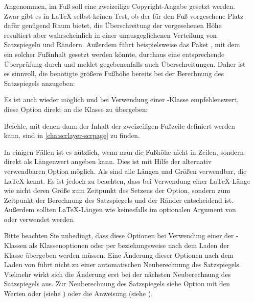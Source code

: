 \begin{Example}
  Angenommen, im Fuß soll eine zweizeilige Copyright-Angabe gesetzt
  werden. Zwar gibt es in \LaTeX{} selbst keinen Test, ob der für den Fuß
  vorgesehene Platz dafür genügend Raum bietet, die Überschreitung der
  vorgesehenen Höhe resultiert aber wahrscheinlich in einer unausgeglichenen
  Verteilung von Satzspiegeln und Rändern. Außerdem führt beispielsweise das
  Paket \hyperref[cha:scrlayer-scrpage]{}%
  , mit dem ein solcher Fuß\-in\-halt gesetzt
  werden könnte, durchaus eine entsprechende Überprüfung durch und meldet
  gegebenenfalls auch Überschreitungen. Daher ist es sinnvoll, die benötigte
  größere Fußhöhe bereits bei der Berechnung des Satzspiegels anzugeben:
  Es ist auch wieder möglich und bei Verwendung einer \KOMAScript-Klasse
  empfehlenswert, diese Option direkt an die Klasse zu übergeben:
  Befehle, mit denen dann der Inhalt der zweizeiligen Fußzeile
  definiert werden kann, sind in \autoref{cha:scrlayer-scrpage} zu finden.
\end{Example}

In einigen Fällen ist es nützlich, wenn man die Fußhöhe nicht in Zeilen,
sondern direkt als Längenwert angeben kann. Dies ist mit Hilfe der alternativ
verwendbaren Option 
möglich. Als  sind alle Längen und Größen verwendbar, die \LaTeX{}
kennt. Es ist jedoch zu beachten, dass bei Verwendung einer \LaTeX-Länge wie
 nicht deren Größe zum Zeitpunkt des Setzens der Option,
sondern zum Zeitpunkt der Berechnung des Satzspiegels und der Ränder
entscheidend ist. Außerdem sollten \LaTeX-Längen wie
 keinesfalls im optionalen Argument von
 oder
 verwendet werden.

Bitte beachten Sie unbedingt, dass diese Optionen bei
Verwendung einer der \KOMAScript-Klassen als Klassenoptionen oder per
 beziehungsweise
 nach dem Laden der Klasse übergeben werden
müssen. Eine Änderung dieser Optionen nach dem Laden von 
führt nicht zu einer automatischen
Neuberechnung des Satzspiegels. Vielmehr wirkt sich die Änderung erst bei der
nächsten Neuberechnung des Satzspiegels aus. Zur Neuberechnung des
Satzspiegels siehe Option
\hyperref[desc:\LabelBase.option.DIV.last]{} mit den Werten
\hyperref[desc:\LabelBase.option.DIV.last]{} oder
\hyperref[desc:\LabelBase.option.DIV.current]{} (siehe
) oder die Anweisung
 (siehe
).%
\EndIndexGroup


